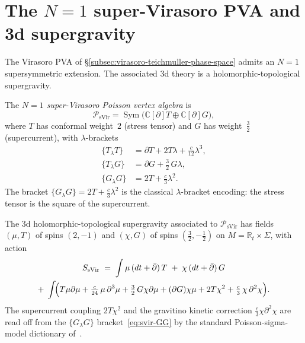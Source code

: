 \section{The \texorpdfstring{$N\!=\!1$}{N=1} super-Virasoro PVA and 3d supergravity}
\label{sec:super-virasoro-pva}

The Virasoro PVA of
\S\ref{subsec:virasoro-teichmuller-phase-space} admits an $N=1$
supersymmetric extension.  The associated 3d theory is a
holomorphic-topological supergravity.

\begin{definition}[$N=1$ super-Virasoro PVA;
\ClaimStatusProvedElsewhere{} \cite{KhanZeng25}]
\label{def:super-virasoro-pva}
The \emph{$N=1$ super-Virasoro Poisson vertex algebra} is
\begin{equation}\label{eq:super-vir-pva}
\mathcal{P}_{\mathrm{sVir}}
= \operatorname{Sym}\!\bigl(\mathbb{C}[\partial]T
  \oplus \mathbb{C}[\partial]G\bigr),
\end{equation}
where $T$ has conformal weight~$2$ (stress tensor) and $G$ has
weight~$\tfrac{3}{2}$ (supercurrent), with $\lambda$-brackets
\begin{align}
\{T_\lambda T\}
  &= \partial T + 2T\lambda + \tfrac{c}{12}\lambda^3,
  \label{eq:svir-TT}\\
\{T_\lambda G\}
  &= \partial G + \tfrac{3}{2}\,G\lambda,
  \label{eq:svir-TG}\\
\{G_\lambda G\}
  &= 2T + \tfrac{c}{3}\lambda^2.
  \label{eq:svir-GG}
\end{align}
The bracket $\{G_\lambda G\} = 2T + \frac{c}{3}\lambda^2$ is the
classical $\lambda$-bracket encoding: the stress tensor is the
square of the supercurrent.
\end{definition}

\begin{proposition}
\label{prop:super-virasoro-3d-action}
The 3d holomorphic-topological supergravity associated to
$\mathcal{P}_{\mathrm{sVir}}$ has fields $(\mu,T)$ of spins
$(2,-1)$ and $(\chi,G)$ of spins $(\frac{3}{2},-\frac{1}{2})$ on
$M = \mathbb{R}_t \times \Sigma$, with action
\begin{multline}\label{eq:super-virasoro-3d-action}
  S_{\mathrm{sVir}}
  \;=\;
  \int \mu\,(dt + \bar\partial)\,T
  \;+\;
  \chi\,(dt + \bar\partial)\,G \\
  +\;\int\!\Bigl(
    T\mu\partial\mu
    + \tfrac{c}{24}\,\mu\,\partial^3\mu
    + \tfrac{3}{2}\,G\chi\partial\mu
    + (\partial G)\chi\mu
    + 2T\chi^2
    + \tfrac{c}{3}\,\chi\,\partial^2\chi
  \Bigr).
\end{multline}
The supercurrent coupling $2T\chi^2$ and the gravitino kinetic
correction $\frac{c}{3}\chi\partial^2\chi$ are read off from the
$\{G_\lambda G\}$ bracket~\eqref{eq:svir-GG} by the standard
Poisson-sigma-model dictionary of~\cite{KhanZeng25}.
\end{proposition}

